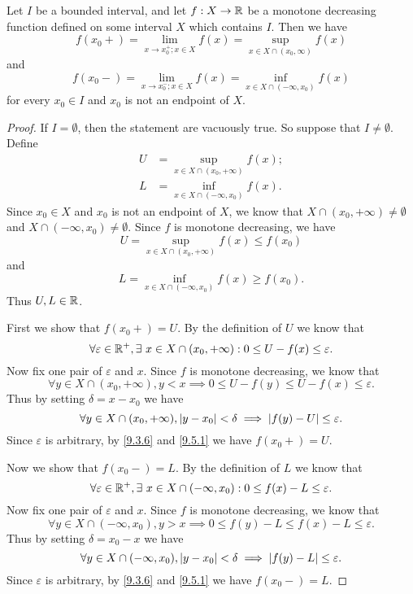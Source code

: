 \begin{ac}\label{ac:11.8.2}
  Let \(I\) be a bounded interval, and let \(f : X \to \mathbb{R}\) be a monotone decreasing function defined on some interval \(X\) which contains \(I\).
  Then we have
  \[
    f(x_0+) = \lim_{x \to x_0^+ ; x \in X} f(x) = \sup_{x \in X \cap (x_0, \infty)} f(x)
  \]
  and
  \[
    f(x_0-) = \lim_{x \to x_0^- ; x \in X} f(x) = \inf_{x \in X \cap (-\infty, x_0)} f(x)
  \]
  for every \(x_0 \in I\) and \(x_0\) is not an endpoint of \(X\).
\end{ac}

\begin{proof}
  If \(I = \emptyset\), then the statement are vacuously true.
  So suppose that \(I \neq \emptyset\).
  Define
  \begin{align*}
    U & = \sup_{x \in X \cap (x_0, +\infty)} f(x); \\
    L & = \inf_{x \in X \cap (-\infty, x_0)} f(x).
  \end{align*}
  Since \(x_0 \in X\) and \(x_0\) is not an endpoint of \(X\), we know that \(X \cap (x_0, +\infty) \neq \emptyset\) and \(X \cap (-\infty, x_0) \neq \emptyset\).
  Since \(f\) is monotone decreasing, we have
  \[
    U = \sup_{x \in X \cap (x_0, +\infty)} f(x) \leq f(x_0)
  \]
  and
  \[
    L = \inf_{x \in X \cap (-\infty, x_0)} f(x) \geq f(x_0).
  \]
  Thus \(U, L \in \mathbb{R}\).

  First we show that \(f(x_0+) = U\).
  By the definition of \(U\) we know that
  \[
    \forall \varepsilon \in \mathbb{R}^+, \exists\ x \in X \cap (x_0, +\infty) : 0 \leq U - f(x) \leq \varepsilon.
  \]
  Now fix one pair of \(\varepsilon\) and \(x\).
  Since \(f\) is monotone decreasing, we know that
  \[
    \forall y \in X \cap (x_0, +\infty), y < x \implies 0 \leq U - f(y) \leq U - f(x) \leq \varepsilon.
  \]
  Thus by setting \(\delta = x - x_0\) we have
  \[
    \forall y \in X \cap (x_0, +\infty), \left\lvert y - x_0\right\rvert < \delta \implies \left\lvert f(y) - U\right\rvert \leq \varepsilon.
  \]
  Since \(\varepsilon\) is arbitrary, by \cref{9.3.6} and \cref{9.5.1} we have \(f(x_0+) = U\).

  Now we show that \(f(x_0-) = L\).
  By the definition of \(L\) we know that
  \[
    \forall \varepsilon \in \mathbb{R}^+, \exists\ x \in X \cap (-\infty, x_0) : 0 \leq f(x) - L \leq \varepsilon.
  \]
  Now fix one pair of \(\varepsilon\) and \(x\).
  Since \(f\) is monotone decreasing, we know that
  \[
    \forall y \in X \cap (-\infty, x_0), y > x \implies 0 \leq f(y) - L \leq f(x) - L \leq \varepsilon.
  \]
  Thus by setting \(\delta = x_0 - x\) we have
  \[
    \forall y \in X \cap (-\infty, x_0), \left\lvert y - x_0\right\rvert < \delta \implies \left\lvert f(y) - L\right\rvert \leq \varepsilon.
  \]
  Since \(\varepsilon\) is arbitrary, by \cref{9.3.6} and \cref{9.5.1} we have \(f(x_0-) = L\).
\end{proof}

